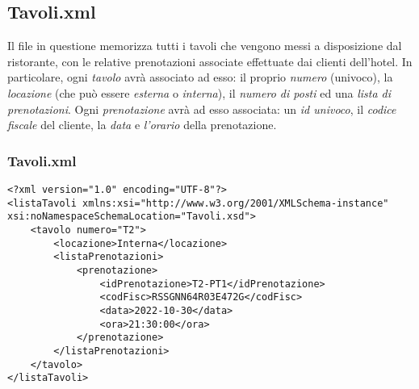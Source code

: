 \documentclass [a4paper, 12pt]{book}
\begin{document}
\medskip

\subsection{Tavoli.xml}
Il file in questione memorizza tutti i tavoli che vengono messi a disposizione dal ristorante, con le relative prenotazioni associate effettuate dai clienti dell'hotel. In particolare, ogni \textit{tavolo} avrà associato ad esso: il proprio \textit{numero} (univoco), la \textit{locazione} (che può essere \textit{esterna} o \textit{interna}), il \textit{numero di posti} ed una \textit{lista di prenotazioni}. Ogni \textit{prenotazione} avrà ad esso associata: un \textit{id univoco}, il \textit{codice fiscale} del cliente, la \textit{data} e \textit{l'orario} della prenotazione.
\subsubsection{Tavoli.xml}
\begin{lstlisting}[style=XML]
<?xml version="1.0" encoding="UTF-8"?>
<listaTavoli xmlns:xsi="http://www.w3.org/2001/XMLSchema-instance" xsi:noNamespaceSchemaLocation="Tavoli.xsd">
    <tavolo numero="T2">
        <locazione>Interna</locazione>
        <listaPrenotazioni>
            <prenotazione>
            	<idPrenotazione>T2-PT1</idPrenotazione>
                <codFisc>RSSGNN64R03E472G</codFisc>
                <data>2022-10-30</data>
                <ora>21:30:00</ora>
            </prenotazione>
        </listaPrenotazioni>
    </tavolo>
</listaTavoli>
\end{lstlisting}
\end{document}
